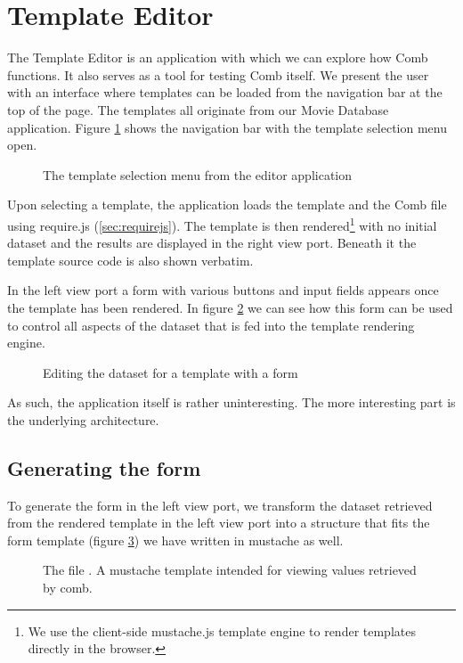 \documentclass[thesis.tex]{subfiles}
\begin{document}
\section{Template Editor}
The Template Editor is an application with which we can explore how Comb
functions.
It also serves as a tool for testing Comb itself.
We present the user with an interface where templates can be loaded from the
navigation bar at the top of the page. The templates all originate from our
Movie Database application. Figure \ref{fig:template-selection} shows the
navigation bar with the template selection menu open.
\begin{figure}
	\centering
	\caption{The template selection menu from the editor application}
	\label{fig:template-selection}
\end{figure}
Upon selecting a template, the application loads the template and the Comb file
using require.js (\ref{sec:requirejs}).
The template is then rendered\footnote{
	We use the client-side mustache.js template engine to render templates
	directly in the browser.
}
with no initial dataset and the results are
displayed in the right view port. Beneath it the template source code is also
shown verbatim.

In the left view port a form with various buttons and input fields appears once
the template has been rendered. In figure \ref{fig:editor-form} we can see how
this form can be used to control all aspects of the dataset that is fed into
the template rendering engine.
\begin{figure}
	\centering
	\caption{Editing the dataset for a template with a form}
	\label{fig:editor-form}
\end{figure}

As such, the application itself is rather uninteresting. The more interesting
part is the underlying architecture.

\subsection{Generating the form}
To generate the form in the left view port, we transform the dataset retrieved
from the rendered template in the left view port into a structure that fits the
form template (figure \ref{fig:mustache.mustache}) we have written in mustache
as well.
\begin{figure}
	\centering
	
	\caption{The file . A mustache template intended for viewing values retrieved by comb.}
	\label{fig:mustache.mustache}
\end{figure}
\end{document}
